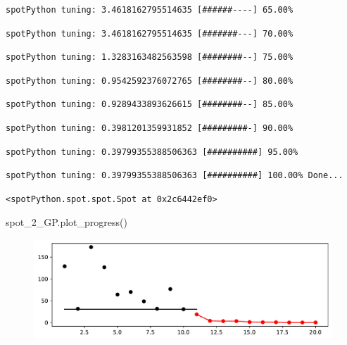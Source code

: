 \documentclass[
  letterpaper,
  DIV=11,
  numbers=noendperiod]{scrreprt}
\newenvironment{Shaded}{\begin{snugshade}}{\end{snugshade}}
\newcommand{\NormalTok}[1]{\textcolor[rgb]{0.00,0.23,0.31}{#1}}
\begin{document}
\begin{verbatim}
spotPython tuning: 3.4618162795514635 [######----] 65.00% 
\end{verbatim}

\begin{verbatim}
spotPython tuning: 3.4618162795514635 [#######---] 70.00% 
\end{verbatim}

\begin{verbatim}
spotPython tuning: 1.3283163482563598 [########--] 75.00% 
\end{verbatim}

\begin{verbatim}
spotPython tuning: 0.9542592376072765 [########--] 80.00% 
\end{verbatim}

\begin{verbatim}
spotPython tuning: 0.9289433893626615 [########--] 85.00% 
\end{verbatim}

\begin{verbatim}
spotPython tuning: 0.3981201359931852 [#########-] 90.00% 
\end{verbatim}

\begin{verbatim}
spotPython tuning: 0.39799355388506363 [##########] 95.00% 
\end{verbatim}

\begin{verbatim}
spotPython tuning: 0.39799355388506363 [##########] 100.00% Done...
\end{verbatim}

\begin{verbatim}
<spotPython.spot.spot.Spot at 0x2c6442ef0>
\end{verbatim}

\begin{Shaded}
\begin{Highlighting}[]
\NormalTok{spot\_2\_GP.plot\_progress()}
\end{Highlighting}
\end{Shaded}

\begin{figure}[H]

{\centering \includegraphics{04_spot_sklearn_surrogate_files/figure-pdf/cell-18-output-1.pdf}

}

\end{figure}
\end{document}
